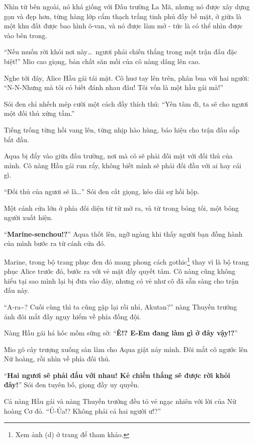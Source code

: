 \documentclass[../main.tex]{subfiles}
\begin{document}
Nhìn từ bên ngoài, nó khá giống với Đấu trường  La Mã, nhưng nó được xây dựng gọn và đẹp hơn, từng hàng lớp cẩm thạch trắng tinh phủ đầy bề mặt, ở giữa là một khu đất được bao hình ô-van, và nó được làm mở - tức là có thể nhìn được vào bên trong.

``Nếu muốn rời khỏi nơi này\dots\ ngươi phải chiến thắng trong một trận đấu đặc biệt!'' Mio cao giọng, bản chất săn mồi của cô nàng dâng lên cao.

Nghe tới đây, Alice Hầu gái tái mặt. Cô huơ tay lên trên, phân bua với hai người: ``N-N-Nhưng mà tôi có biết đánh nhau đâu! Tôi vốn là một hầu gái mà!''

Sói đen chỉ nhếch mép cười một cách đầy thích thú: ``Yên tâm đi, ta sẽ cho ngươi một đối thủ xứng tầm.''

Tiếng trống từng hồi vang lên, từng nhịp hào hùng, báo hiệu cho trận đấu sắp bắt đầu.

Aqua bị đẩy vào giữa đấu trường, nơi mà cô sẽ phải đối mặt với đối thủ của mình. Cô nàng Hầu gái run rẩy, không biết mình sẽ phải đối đầu với ai hay cái gì.

``Đối thủ của ngươi sẽ là\dots'' Sói đen cất giọng, kéo dài sự hồi hộp.

Một cánh cửa lớn ở phía đối diện từ từ mở ra, và từ trong bóng tối, một bóng người xuất hiện.

``\textbf{Marine-senchou!?}'' Aqua thốt lên, ngỡ ngàng khi thấy người bạn đồng hành của mình bước ra từ cánh cửa đó.

Marine, trong bộ trang phục đen đỏ mang phong cách gothic\footnote{Xem ảnh (d) ở trang \pageref{wonderland} để tham khảo.} thay vì là bộ trang phục Alice trước đó, bước ra với vẻ mặt đầy quyết tâm. Cô nàng cũng không hiểu tại sao mình lại bị đưa vào đây, nhưng có vẻ như cô đã sẵn sàng cho trận đấu này.

``A-ra\~{}? Cuối cùng thì ta cũng gặp lại rồi nhỉ, Akutan?'' nàng Thuyền trưởng ánh đôi mắt đầy nguy hiểm về phía đồng đội.

Nàng Hầu gái há hốc mồm sững sờ: ``\textbf{Ẻ!? E-Em đang làm gì ở đây vậy!?}''

Mio gõ cây trượng xuống sàn làm cho Aqua giật nảy mình. Đôi mắt cô ngước lên Nữ hoàng, rồi nhìn về phía đối thủ.

``\textbf{Hai ngươi sẽ phải đấu với nhau! Kẻ chiến thắng sẽ được rời khỏi đây!}'' Sói đen tuyên bố, giọng đầy uy quyền.

Cả nàng Hầu gái và nàng Thuyền trưởng đều tỏ vẻ ngạc nhiên với lời của Nữ hoàng Cơ đỏ. ``Ủ-Ủa!? Không phải cả hai người ư!?''
\end{document}
